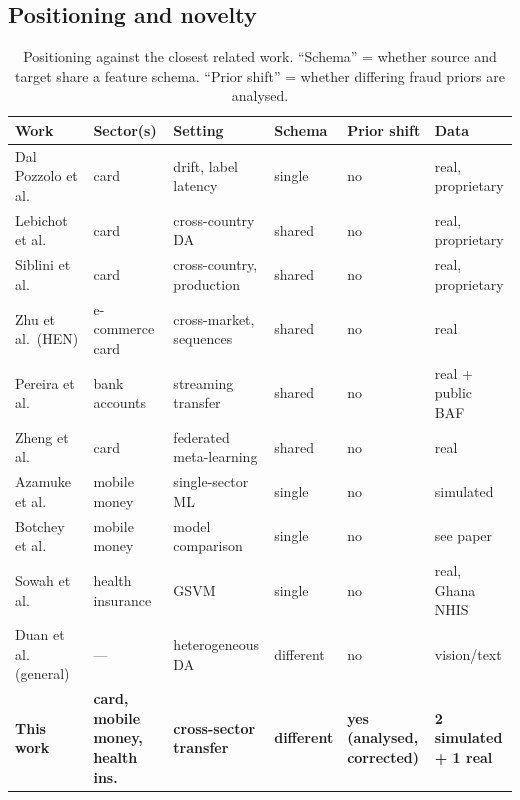 \documentclass[journal]{IEEEtran}
\newcommand{\1}{\mathbf{1}}
\begin{document}
\subsection{Positioning and novelty}\label{sec:positioning}
\begin{table}[t]
\centering
\caption{Positioning against the closest related work. ``Schema'' = whether source and target share a feature schema. ``Prior shift'' = whether differing fraud priors are analysed.}
\label{tab:related}
\small
\begin{tabular}{@{}p{3.6cm}p{2.6cm}p{3.2cm}p{1.5cm}p{1.5cm}p{3.3cm}@{}}
\toprule
Work & Sector(s) & Setting & Schema & Prior shift & Data \\
\midrule
Dal Pozzolo et al.\ \cite{dalpozzolo2018realistic} & card & drift, label latency & single & no & real, proprietary \\
Lebichot et al.\ \cite{lebichot2021transfer} & card & cross-country DA & shared & no & real, proprietary \\
Siblini et al.\ \cite{siblini2021transfer} & card & cross-country, production & shared & no & real, proprietary \\
Zhu et al.\ (HEN) \cite{zhu2020hen} & e-commerce card & cross-market, sequences & shared & no & real \\
Pereira et al.\ \cite{pereira2025evaluating} & bank accounts & streaming transfer & shared & no & real + public BAF \\
Zheng et al.\ \cite{zheng2020federated} & card & federated meta-learning & shared & no & real \\
Azamuke et al.\ \cite{azamuke2025rich} & mobile money & single-sector ML & single & no & simulated \\
Botchey et al.\ \cite{botchey2020mobile} & mobile money & model comparison & single & no & see paper \\
Sowah et al.\ \cite{sowah2019dss} & health insurance & GSVM & single & no & real, Ghana NHIS \\
Duan et al.\ \cite{duan2012hfa} (general) & --- & heterogeneous DA & different & no & vision/text \\
\textbf{This work} & \textbf{card, mobile money, health ins.} & \textbf{cross-sector transfer} & \textbf{different} & \textbf{yes (analysed, corrected)} & \textbf{2 simulated + 1 real} \\
\bottomrule
\end{tabular}
\end{table}
\end{document}
